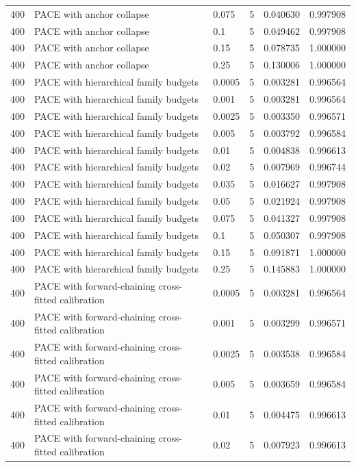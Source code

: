 \begin{tabular}{llllll}
400 & PACE with anchor collapse & 0.075 & 5 & 0.040630 & 0.997908 \\
400 & PACE with anchor collapse & 0.1 & 5 & 0.049462 & 0.997908 \\
400 & PACE with anchor collapse & 0.15 & 5 & 0.078735 & 1.000000 \\
400 & PACE with anchor collapse & 0.25 & 5 & 0.130006 & 1.000000 \\
400 & PACE with hierarchical family budgets & 0.0005 & 5 & 0.003281 & 0.996564 \\
400 & PACE with hierarchical family budgets & 0.001 & 5 & 0.003281 & 0.996564 \\
400 & PACE with hierarchical family budgets & 0.0025 & 5 & 0.003350 & 0.996571 \\
400 & PACE with hierarchical family budgets & 0.005 & 5 & 0.003792 & 0.996584 \\
400 & PACE with hierarchical family budgets & 0.01 & 5 & 0.004838 & 0.996613 \\
400 & PACE with hierarchical family budgets & 0.02 & 5 & 0.007969 & 0.996744 \\
400 & PACE with hierarchical family budgets & 0.035 & 5 & 0.016627 & 0.997908 \\
400 & PACE with hierarchical family budgets & 0.05 & 5 & 0.021924 & 0.997908 \\
400 & PACE with hierarchical family budgets & 0.075 & 5 & 0.041327 & 0.997908 \\
400 & PACE with hierarchical family budgets & 0.1 & 5 & 0.050307 & 0.997908 \\
400 & PACE with hierarchical family budgets & 0.15 & 5 & 0.091871 & 1.000000 \\
400 & PACE with hierarchical family budgets & 0.25 & 5 & 0.145883 & 1.000000 \\
400 & PACE with forward-chaining cross-fitted calibration & 0.0005 & 5 & 0.003281 & 0.996564 \\
400 & PACE with forward-chaining cross-fitted calibration & 0.001 & 5 & 0.003299 & 0.996571 \\
400 & PACE with forward-chaining cross-fitted calibration & 0.0025 & 5 & 0.003538 & 0.996584 \\
400 & PACE with forward-chaining cross-fitted calibration & 0.005 & 5 & 0.003659 & 0.996584 \\
400 & PACE with forward-chaining cross-fitted calibration & 0.01 & 5 & 0.004475 & 0.996613 \\
400 & PACE with forward-chaining cross-fitted calibration & 0.02 & 5 & 0.007923 & 0.996613 \\

\end{tabular}
